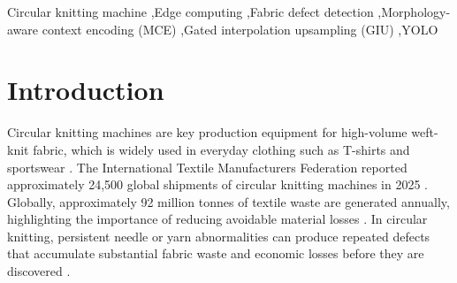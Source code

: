 \documentclass[a4paper,fleqn]{cas-dc}
\newcommand{\model}{MCGI-YOLO\xspace}
\begin{document}
\begin{abstract}
Conventional fabric inspection is typically performed after knitting, meaning that persistent needle or yarn abnormalities often accumulate substantial material waste before discovery. To address this issue, we present a defect detection system that integrates real-time inspection directly into the circular knitting process. The system combines rotation-activated detection, image acquisition, edge inference, and local machine stop control to limit defective fabric production. To enable efficient inference on resource-constrained edge devices, we propose \model, a lightweight detector guided by systematic observations of knitting defect morphologies. It incorporates a morphology-aware context encoding (MCE) module to capture the spatial continuity of elongated horizontal and vertical defects, and a gated interpolation upsampling (GIU) module for content-adaptive feature reconstruction across diverse scales. On a self-collected dataset, \model achieves 97.2\% mAP@50 and 65.5\% mAP@50:95, outperforming YOLOv8n by 6.7 and 7.1 percentage points, respectively. After INT8 quantization, the model maintains 96.7\% mAP@50 with an inference throughput of 23 FPS on the edge device. These results demonstrate the potential of the proposed system for scalable real-time defect detection on circular knitting machines in the textile industry.
\end{abstract}
\begin{keywords}
Circular knitting machine \sep Edge computing \sep Fabric defect detection \sep Morphology-aware context encoding (MCE) \sep Gated interpolation upsampling (GIU) \sep YOLO
\end{keywords}
\maketitle
\setlength{\abovedisplayskip}{5pt plus 2pt minus 2pt}
\setlength{\belowdisplayskip}{5pt plus 2pt minus 2pt}
\setlength{\abovedisplayshortskip}{0pt plus 2pt}
\setlength{\belowdisplayshortskip}{3pt plus 2pt minus 2pt}

\section{Introduction}
Circular knitting machines are key production equipment for high-volume weft-knit fabric, which is widely used in everyday clothing such as T-shirts and sportswear \cite{cottonworksKnitBasics,woolmarkCircularKnitting,cottonworksSingleDouble}. The International Textile Manufacturers Federation reported approximately 24,500 global shipments of circular knitting machines in 2025 \cite{itmf2025press}. Globally, approximately 92 million tonnes of textile waste are generated annually, highlighting the importance of reducing avoidable material losses \cite{unep2025textilewaste}. In circular knitting, persistent needle or yarn abnormalities can produce repeated defects that accumulate substantial fabric waste and economic losses before they are discovered \cite{takeuchi2018knitted,akter2022material,xiang2023hooknet}.
\end{document}

